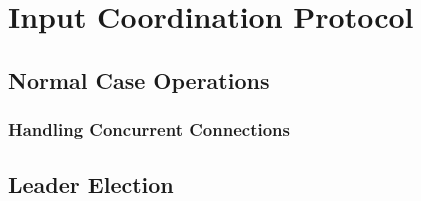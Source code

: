 \section{Input Coordination Protocol} \label{sec:input}


\subsection{Normal Case Operations} \label{sec:normal}







% 

\subsubsection{Handling Concurrent Connections} \label{sec:concurrent}




\subsection{Leader Election} \label{sec:election}

